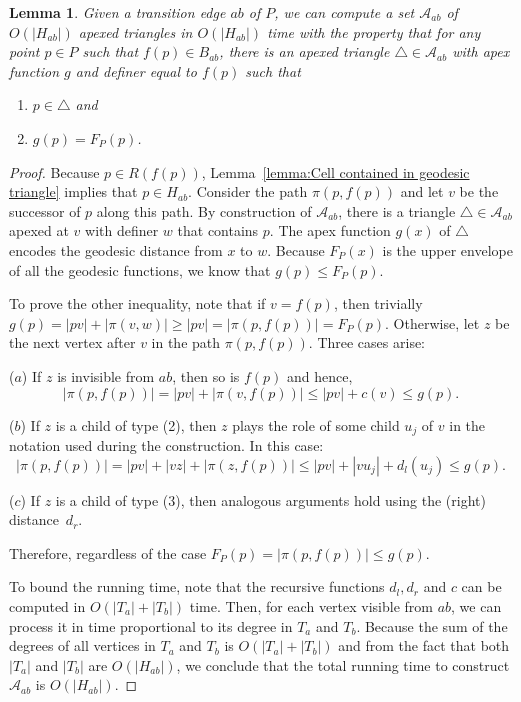\documentclass[a4paper]{article}
\newtheorem{lemma}[theorem]{Lemma}
\newcommand{\F}[2]{\ensuremath{F_{\scriptscriptstyle #1}(#2)}}
\newcommand{\ff}[1]{\ensuremath{f(#1)}}
\newcommand{\g}[2]{\ensuremath{|\pi(#1, #2)|}}
\newcommand{\p}[2]{\ensuremath{\pi(#1, #2)}}
\begin{document}
\begin{lemma}\label{lemma:Triangles inside hourglasses}
Given a transition edge $ab$ of $P$, we can compute a set $\mathcal A_{ab}$ of $O(|H_{ab}|)$ apexed triangles in $O(|H_{ab}|)$ time with the property that for any point $p\in P$ such that $\ff{p}\in B_{ab}$,
there is an apexed triangle $\triangle\in \mathcal A_{ab}$ with apex function $g$ and definer equal to $\ff{p}$ such that
\begin{enumerate}
\item $p\in \triangle$ and 
\item $g(p) = \F{P}{p}$.
\end{enumerate}
\end{lemma}
\begin{proof}
Because $p\in R(\ff{p})$, Lemma~\ref{lemma:Cell contained in geodesic triangle} implies that $p\in H_{ab}$. 
Consider the path $\p{p}{\ff{p}}$ and let $v$ be the successor of $p$ along this path. 
By construction of $\mathcal A_{ab}$, there is a triangle $\triangle\in \mathcal A_{ab}$ apexed at $v$ with definer $w$ that contains $p$. The apex function $g(x)$ of $\triangle$ encodes the geodesic distance from $x$ to $w$. 
Because $\F{P}{x}$ is the upper envelope of all the geodesic functions, we know that $g(p) \leq \F{P}{p}$.

To prove the other inequality, note that if $v = \ff{p}$, then trivially $g(p) = |pv| + \g{v}{w} \geq |pv| = \g{p}{\ff{p}} = \F{P}{p}$. 
Otherwise, let $z$ be the next vertex after $v$ in the path $\p{p}{\ff{p}}$. Three cases arise:

($a$) If $z$ is invisible from $ab$, then so is $\ff{p}$ and hence, 
$$\g{p}{ \ff{p}} = |pv| + \g{v}{ \ff{p}} \leq |pv| + c(v) \leq g(p).$$

($b$) If $z$ is a child of type (2), then $z$ plays the role of some child $u_j$ of $v$ in the notation used during the construction.
In this case:
$$\g{p}{\ff{p}} = |pv| + |v z| + \g{z}{\ff{p}} \leq |pv| + |v u_j| + d_l(u_j) \leq g(p).$$

($c$) If $z$ is a child of type (3), then analogous arguments hold using the (right) distance~$d_r$.

Therefore, regardless of the case $\F{P}{p} = \g{p}{ \ff{p}} \leq g(p)$.

To bound the running time, note that the recursive functions $d_l, d_r$ and $c$ can be computed in $O(|T_a| + |T_b|)$ time. Then, for each vertex visible from $ab$, we can process it in time proportional to its degree in $T_a$ and $T_b$.
Because the sum of the degrees of all vertices in $T_a$ and $T_b$ is $O(|T_a| + |T_b|)$ and from the fact that both $|T_a|$ and $|T_b|$ are $O(|H_{ab}|)$, we conclude that the total running time to construct $\mathcal A_{ab}$ is $O(|H_{ab}|)$.
\end{proof}
\end{document}
